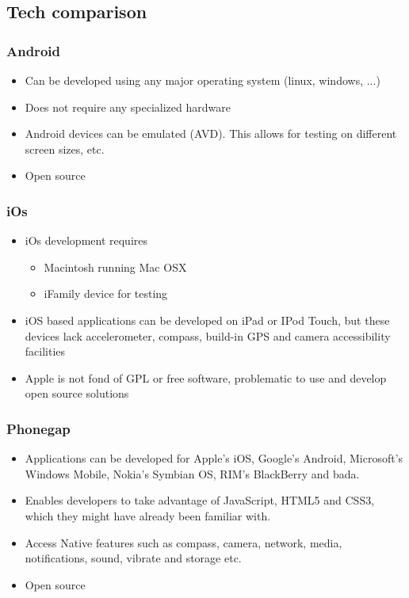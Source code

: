 \subsection{Tech comparison}

\subsubsection{Android}

	\begin{itemize}
		\item Can be developed using any major operating system (linux, windows, ...)
		\item Does not require any specialized hardware
		\item Android devices can be emulated (AVD). This allows for testing on
		different screen sizes, etc.
		\item Open source
	\end{itemize}

\subsubsection{iOs}

	\begin{itemize}
		\item iOs development requires
			\begin{itemize}
				\item Macintosh running Mac OSX
				\item iFamily device for testing
			\end{itemize}
		\item iOS based applications can be developed on iPad or IPod Touch, but
		these devices lack accelerometer, compass, build-in GPS and camera
		accessibility facilities
		\item Apple is not fond of GPL or free software, problematic to use and
		develop open source solutions 
	\end{itemize}

\subsubsection{Phonegap}

	\begin{itemize}
		\item Applications can be developed for Apple’s iOS, Google’s Android,
		Microsoft’s Windows Mobile, Nokia’s Symbian OS, RIM’s BlackBerry and bada.
		\item Enables developers to take advantage of JavaScript, HTML5 and CSS3,
		which they might have already been familiar with.
		\item Access Native features such as compass, camera, network, media,
		notifications, sound, vibrate and storage etc.
		\item Open source
	\end{itemize}
